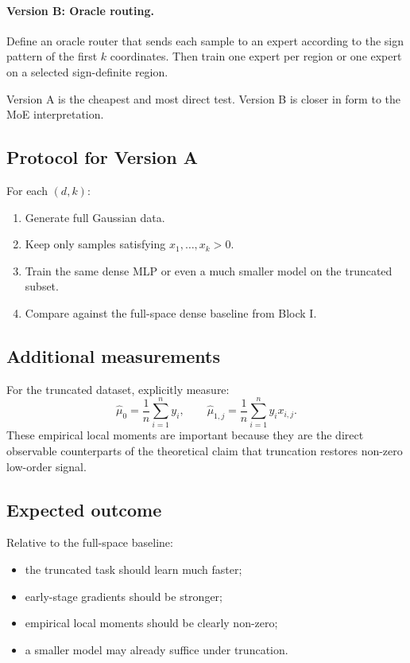 \documentclass[11pt]{article}
\begin{document}
\paragraph{Version B: Oracle routing.}
Define an oracle router that sends each sample to an expert according to the sign pattern of the first $k$ coordinates. Then train one expert per region or one expert on a selected sign-definite region.

Version A is the cheapest and most direct test. Version B is closer in form to the MoE interpretation.

\subsection{Protocol for Version A}

For each $(d,k)$:
\begin{enumerate}[leftmargin=2em]
    \item Generate full Gaussian data.
    \item Keep only samples satisfying $x_1,\dots,x_k > 0$.
    \item Train the same dense MLP or even a much smaller model on the truncated subset.
    \item Compare against the full-space dense baseline from Block I.
\end{enumerate}

\subsection{Additional measurements}

For the truncated dataset, explicitly measure:
\begin{equation}
    \hat{\mu}_0 = \frac{1}{n}\sum_{i=1}^n y_i,
    \qquad
    \hat{\mu}_{1,j} = \frac{1}{n}\sum_{i=1}^n y_i x_{i,j}.
\end{equation}
These empirical local moments are important because they are the direct observable counterparts of the theoretical claim that truncation restores non-zero low-order signal.

\subsection{Expected outcome}

Relative to the full-space baseline:
\begin{itemize}[leftmargin=2em]
    \item the truncated task should learn much faster;
    \item early-stage gradients should be stronger;
    \item empirical local moments should be clearly non-zero;
    \item a smaller model may already suffice under truncation.
\end{itemize}
\end{document}
